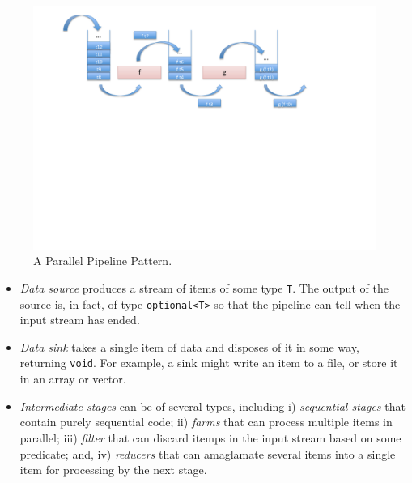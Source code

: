 \begin{figure}[!ht]
\includegraphics[width=12cm]{figures/pipeline.pdf}

\caption{A Parallel Pipeline Pattern.}
\label{pipeline1}
\end{figure}

\begin{itemize}
\item \emph{Data source} produces a stream of items of some type \verb|T|.
The output of the source is, in fact, of type \verb|optional<T>| so
that the pipeline can tell when the input stream has
ended.


\item \emph{Data sink} takes a single item of data and disposes of it in some way, returning \verb|void|.
For example, a sink might write an item to a file, or store it in an array or vector.

\item \emph{Intermediate stages} can be of several types, including i) \emph{sequential stages} that contain
  purely sequential code; ii) \emph{farms} that can process multiple items in parallel; iii) \emph{filter} that can
  discard itemps in the input stream based on some predicate; and, iv) \emph{reducers} that can amaglamate several
  items into a single item for processing by the next stage.

\end{itemize}


